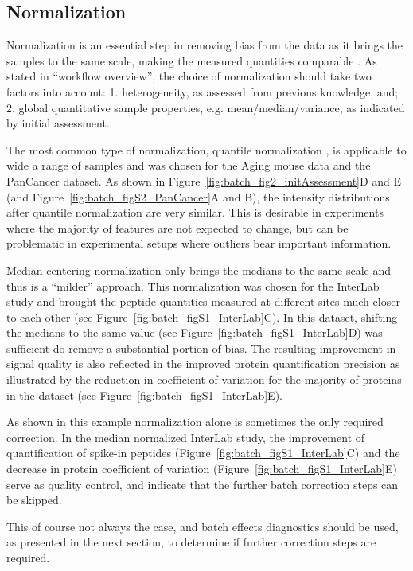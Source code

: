 \documentclass[num-refs]{wiley-article}
\begin{document}
\subsection{Normalization}

Normalization is an essential step in removing bias from the data as it brings the samples to the same scale, making the measured quantities comparable \cite{Leek:2010aa}. As stated in “workflow overview”, the choice of normalization should take two factors into account: 1. heterogeneity, as assessed from previous knowledge, and; 2. global quantitative sample properties, e.g. mean/median/variance, as indicated by initial assessment.

The most common type of normalization, quantile normalization \cite{Bolstad2003}, is applicable to wide a range of samples and was chosen for the Aging mouse data and the PanCancer dataset. As shown in Figure~\ref{fig:batch_fig2_initAssessment}D and E (and Figure~\ref{fig:batch_figS2_PanCancer}A and B), the intensity distributions after quantile normalization are very similar.  This is desirable in experiments where the majority of features are not expected to change, but can be problematic in experimental setups where outliers bear important information.

Median centering normalization only brings the medians to the same scale and thus is a “milder” approach. This normalization was chosen for the InterLab study and brought the peptide quantities measured at different sites much closer to each other (see Figure~\ref{fig:batch_figS1_InterLab}C). In this dataset, shifting the medians to the same value (see Figure~\ref{fig:batch_figS1_InterLab}D) was sufficient do remove a substantial portion of bias. The resulting improvement in signal quality is also reflected in the improved protein quantification precision as illustrated by the reduction in  coefficient of variation for the majority of proteins in the dataset (see Figure~\ref{fig:batch_figS1_InterLab}E).

As shown in this example normalization alone is sometimes the only required correction. In the median normalized InterLab study, the improvement of quantification of spike-in peptides (Figure~\ref{fig:batch_figS1_InterLab}C) and the decrease in protein coefficient of variation (Figure~\ref{fig:batch_figS1_InterLab}E) serve as quality control, and indicate that the further batch correction steps can be skipped.

This of course not always the case, and batch effects diagnostics should be used, as presented in the next section, to determine if further correction steps are required.
\end{document}
